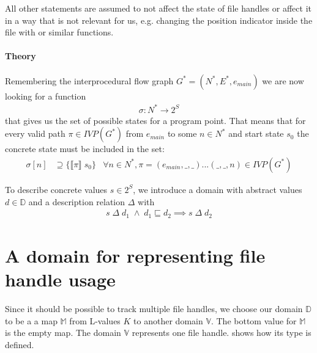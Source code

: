 All other statements are assumed to not affect the state of file handles or affect it in a way that is not relevant for us, e.g. changing the position indicator inside the file with  or similar functions.

\paragraph*{Theory}
Remembering the interprocedural flow graph $G^* = (N^*, E^*, e_{main})$ we are now looking for a function
\begin{align}
\sigma : N^* \to 2^S
\end{align}
that gives us the set of possible states for a program point.
That means that for every valid path $\pi \in \mathit{IVP}(G^*)$ from $e_{main}$ to some $n \in N^*$ and start state $s_0$ the concrete state must be included in the set:
\begin{align}
\sigma[n] &\supseteq \{ \llbracket \pi \rrbracket \; s_0 \}		&\forall n \in N^*, \pi = (e_{main},\_,\_)...(\_,\_,n) \in \mathit{IVP}(G^*)
\end{align}

To describe concrete values $s \in 2^S$, we introduce a domain with abstract values $d \in \mathbb{D}$ and a description relation $\Delta$ with
\begin{align}
s \;\Delta\; d_1 \;\wedge\; d_1 \sqsubseteq d_2 \implies s \;\Delta\; d_2
\end{align}


%
%
%


\section{A domain for representing file handle usage}
Since it should be possible to track multiple file handles, we choose our domain $\mathbb{D}$ to be a a map $\mathbb{M}$ from L-values $K$ to another domain $\mathbb{V}$. The bottom value for $\mathbb{M}$ is the empty map.
The domain $\mathbb{V}$ represents one file handle.  shows how its type  is defined.

